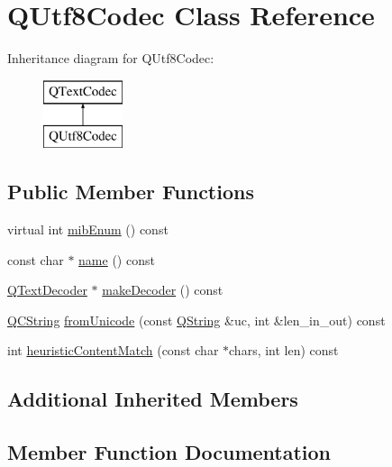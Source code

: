 \hypertarget{class_q_utf8_codec}{}\section{Q\+Utf8\+Codec Class Reference}
\label{class_q_utf8_codec}
Inheritance diagram for Q\+Utf8\+Codec\+:\begin{figure}[H]
\begin{center}
\leavevmode
\includegraphics[height=2.000000cm]{class_q_utf8_codec}
\end{center}
\end{figure}
\subsection*{Public Member Functions}
\begin{DoxyCompactItemize}
\item 
virtual int \mbox{\hyperlink{class_q_utf8_codec_aab3ccc43cc2595bc81e5fbf2d5b2776a}{mib\+Enum}} () const
\item 
const char $\ast$ \mbox{\hyperlink{class_q_utf8_codec_a9857944175edc61a1e568a2503a5c434}{name}} () const
\item 
\mbox{\hyperlink{class_q_text_decoder}{Q\+Text\+Decoder}} $\ast$ \mbox{\hyperlink{class_q_utf8_codec_a0e08549580abc7270123937115f746c8}{make\+Decoder}} () const
\item 
\mbox{\hyperlink{class_q_c_string}{Q\+C\+String}} \mbox{\hyperlink{class_q_utf8_codec_a1fd5a6d941fd0e934a60118c118c96c7}{from\+Unicode}} (const \mbox{\hyperlink{class_q_string}{Q\+String}} \&uc, int \&len\+\_\+in\+\_\+out) const
\item 
int \mbox{\hyperlink{class_q_utf8_codec_a30b73712b3cb1d243986eb406a3b7b5b}{heuristic\+Content\+Match}} (const char $\ast$chars, int len) const
\end{DoxyCompactItemize}
\subsection*{Additional Inherited Members}


\subsection{Member Function Documentation}
\mbox{\label{class_q_utf8_codec_a1fd5a6d941fd0e934a60118c118c96c7}} 
